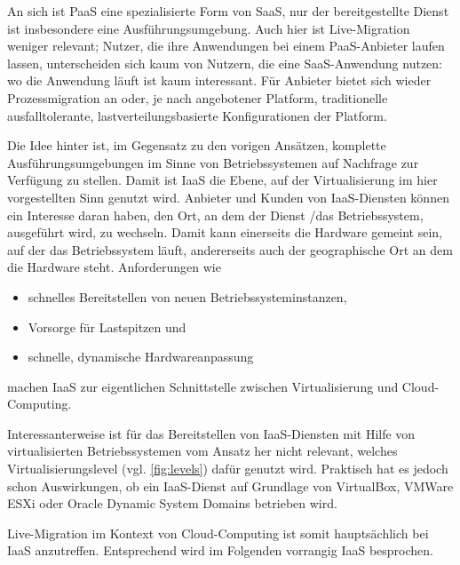 \begin{description}
  An sich ist \ac{PaaS} eine spezialisierte Form von \ac{SaaS}, nur
  der bereitgestellte Dienst ist insbesondere eine
  Ausführungsumgebung. Auch hier ist Live-Migration weniger relevant;
  Nutzer, die ihre Anwendungen bei einem \ac{PaaS}-Anbieter laufen
  lassen, unterscheiden sich kaum von Nutzern, die eine
  \ac{SaaS}-Anwendung nutzen: wo die Anwendung läuft ist kaum
  interessant. Für Anbieter bietet sich wieder Prozessmigration an
  oder, je nach angebotener Platform, traditionelle ausfalltolerante,
  lastverteilungsbasierte Konfigurationen der Platform.
\item[IaaS] Die Idee hinter  ist, im Gegensatz zu den
  vorigen Ansätzen, komplette Ausführungsumgebungen im Sinne von
  Betriebssystemen auf Nachfrage zur Verfügung zu stellen. Damit ist
  \ac{IaaS} die Ebene, auf der Virtualisierung im hier vorgestellten
  Sinn genutzt wird. Anbieter und Kunden von \ac{IaaS}-Diensten
  können ein Interesse daran haben, den Ort, an dem der Dienst /das
  Betriebssystem, ausgeführt wird, zu wechseln. Damit kann einerseits
  die Hardware gemeint sein, auf der das Betriebssystem läuft,
  andererseits auch der geographische Ort an dem die Hardware steht.
  Anforderungen wie
  \begin{itemize}
  \item schnelles Bereitstellen von neuen Betriebssysteminstanzen,
  \item Vorsorge für Lastspitzen und
  \item schnelle, dynamische Hardwareanpassung
  \end{itemize}
  machen \ac{IaaS} zur eigentlichen Schnittstelle zwischen
  Virtualisierung und Cloud-Computing.

  Interessanterweise ist für das Bereitstellen von \ac{IaaS}-Diensten
  mit Hilfe von virtualisierten Betriebssystemen vom Ansatz her nicht
  relevant, welches Virtualisierungslevel (vgl.
  \autoref{fig:levels}) dafür genutzt wird. Praktisch hat es jedoch
  schon Auswirkungen, ob ein \ac{IaaS}-Dienst auf Grundlage von
  VirtualBox, VMWare ESXi oder Oracle Dynamic System Domains betrieben wird.
\end{description}

Live-Migration im Kontext von Cloud-Computing ist somit hauptsächlich
bei \ac{IaaS}  anzutreffen. Entsprechend wird im Folgenden vorrangig
\ac{IaaS} besprochen.


